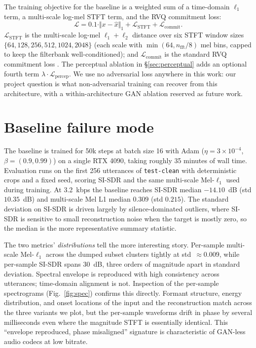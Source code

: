 \documentclass[11pt]{article}
\begin{document}
The training objective for the baseline is a weighted sum of a
time-domain $\ell_1$ term, a multi-scale log-mel STFT term, and the
RVQ commitment loss:
\begin{equation}
\mathcal{L}
= 0.1 \cdot \Vert x - \hat x \Vert_1
+ \mathcal{L}_{\text{STFT}}
+ \mathcal{L}_{\text{commit}}.
\end{equation}
$\mathcal{L}_{\text{STFT}}$ is the multi-scale log-mel
$\ell_1+\ell_2$ distance over six STFT window sizes
$\{64,128,256,512,1024,2048\}$ (each scale with $\min(64, n_{\text{fft}}/8)$
mel bins, capped to keep the filterbank well-conditioned);
and $\mathcal{L}_{\text{commit}}$ is the standard RVQ commitment
loss \citep{vandenoord2017neural}. The perceptual ablation in
\S\ref{sec:perceptual} adds an optional fourth term
$\lambda \cdot \mathcal{L}_{\text{percep}}$. We use no adversarial
loss anywhere in this work: our project question is what
non-adversarial training can recover from this architecture, with
a within-architecture GAN ablation reserved as future work.

\section{Baseline failure mode}
\label{sec:failure}

The baseline is trained for 50k steps at batch size 16 with Adam
($\eta = 3\!\times\!10^{-4}$, $\beta = (0.9, 0.99)$) on a single
RTX 4090, taking roughly 35 minutes of wall time. Evaluation runs
on the first 256 utterances of \texttt{test-clean} with deterministic
crops and a fixed seed, scoring SI-SDR and the same multi-scale
Mel-$\ell_1$ used during training. At 3.2~kbps the baseline reaches
SI-SDR median $-14.10$~dB (std $10.35$~dB) and multi-scale Mel L1
median $0.309$ (std $0.215$). The standard deviation on SI-SDR is
driven largely by silence-dominated outliers, where SI-SDR is
sensitive to small reconstruction noise when the target is mostly
zero, so the median is the more representative summary statistic.

The two metrics' \emph{distributions} tell the more interesting
story. Per-sample multi-scale Mel-$\ell_1$ across the dumped subset
clusters tightly at std~$\approx 0.009$, while per-sample SI-SDR
spans 30~dB, three orders of magnitude apart in standard deviation.
Spectral envelope is reproduced with high consistency across
utterances; time-domain alignment is not. Inspection of the
per-sample spectrograms (Fig.~\ref{fig:spec}) confirms this directly.
Formant structure, energy distribution, and onset locations of the
input and the reconstruction match across the three variants we
plot, but the per-sample waveforms drift in phase by several
milliseconds even where the magnitude STFT is essentially identical.
This ``envelope reproduced, phase misaligned'' signature is
characteristic of GAN-less audio codecs at low bitrate.
\end{document}
